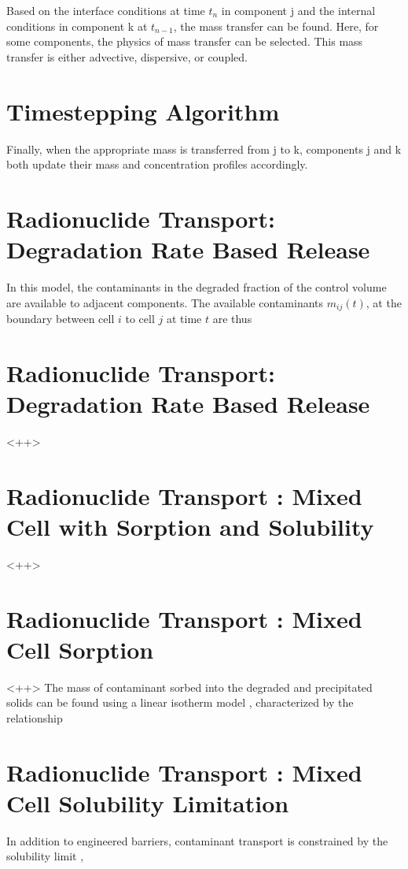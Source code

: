\documentclass[letterpaper]{article}
\begin{document}
{Based on the interface conditions at time $t_n$ in component j and the 
internal conditions in component k at $t_{n-1}$, the mass transfer can be 
found. Here, for some components, the physics of mass transfer can be selected. 
This mass transfer is either advective, dispersive, or coupled. 

\section{Timestepping Algorithm}

Finally, when the appropriate mass is transferred from j to k, components j and 
k both update their mass and concentration profiles accordingly.


  \section{Radionuclide Transport: Degradation Rate Based Release}
In this model, the contaminants in the degraded fraction of the control volume 
are available to adjacent components. The available contaminants
$m_{ij}(t)$, at the boundary between cell $i$ to cell $j$ at time $t$ are thus

  \section{Radionuclide Transport: Degradation Rate Based Release}
<++>

  \section{Radionuclide Transport : Mixed Cell with Sorption and Solubility}
<++>

  \section{Radionuclide Transport : Mixed Cell Sorption}
<++>
The mass of contaminant sorbed into the degraded and precipitated solids can be
found using a linear isotherm model \cite{schwartz_fundamentals_2004},
characterized by the relationship 

  \section{Radionuclide Transport : Mixed Cell Solubility Limitation}
In addition to engineered barriers, contaminant transport is constrained by 
  the solubility limit \cite{hedin_integrated_2002}, 

}
\end{document}
